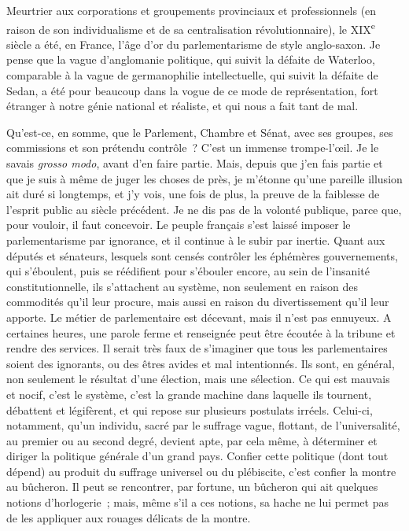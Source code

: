 \documentclass[french,twoside]{book} %
\begin{document}
Meurtrier aux corporations et groupements provinciaux et professionnels (en raison de son individualisme et de sa centralisation révolutionnaire), le XIX\textsuperscript{e} siècle a été, en France, l’âge d’or du parlementarisme de style anglo-saxon. Je pense que la vague d’anglomanie politique, qui suivit la défaite de Waterloo, comparable à la vague de germanophilie intellectuelle, qui suivit la défaite de Sedan, a été pour beaucoup dans la vogue de ce mode de représentation, fort étranger à notre génie national et réaliste, et qui nous a fait tant de mal.\par
Qu’est-ce, en somme, que le Parlement, Chambre et Sénat, avec ses groupes, ses commissions et son prétendu contrôle ? C’est un immense trompe-l’œil. Je le savais {\itshape grosso modo}, avant d’en faire partie. Mais, depuis que j’en fais partie et que je suis à même de juger les choses de près, je m’étonne qu’une pareille illusion ait duré si longtemps, et j’y vois, une fois de plus, la preuve de la faiblesse de l’esprit public au siècle précédent. Je ne dis pas de la volonté publique, parce que, pour vouloir, il faut concevoir. Le peuple français s’est laissé imposer le parlementarisme par ignorance, et il continue à le subir par inertie. Quant aux députés et sénateurs, lesquels sont censés contrôler les éphémères gouvernements, qui s’éboulent, puis se réédifient pour s’ébouler encore, au sein de l’insanité constitutionnelle, ils s’attachent au système, non seulement en raison des commodités qu’il leur procure, mais aussi en raison du divertissement qu’il leur apporte. Le métier de parlementaire est décevant, mais il n’est pas ennuyeux. A certaines heures, une parole ferme et renseignée peut être écoutée à la tribune et rendre des services. Il serait très faux de s’imaginer que tous les parlementaires soient des ignorants, ou des êtres avides et mal intentionnés. Ils sont, en général, non seulement le résultat d’une élection, mais une sélection. Ce qui est mauvais et nocif, c’est le système, c’est la grande machine dans laquelle ils tournent, débattent et légifèrent, et qui repose sur plusieurs postulats irréels. Celui-ci, notamment, qu’un individu, sacré par le suffrage vague, flottant, de l’universalité, au premier ou au second degré, devient apte, par cela même, à déterminer et diriger la politique générale d’un grand pays. Confier cette politique (dont tout dépend) au produit du suffrage universel ou du plébiscite, c’est confier la montre au bûcheron. Il peut se rencontrer, par fortune, un bûcheron qui ait quelques notions d’horlogerie ; mais, même s’il a ces notions, sa hache ne lui permet pas de les appliquer aux rouages délicats de la montre.\par
\end{document}
